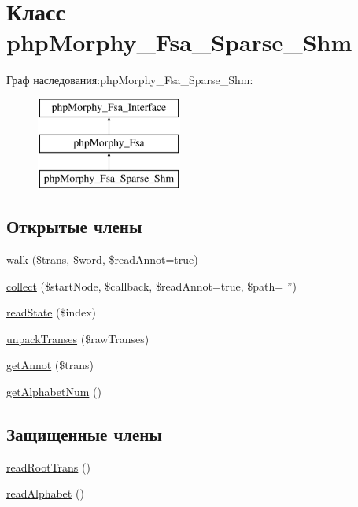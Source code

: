 \hypertarget{classphpMorphy__Fsa__Sparse__Shm}{
\section{Класс phpMorphy\_\-Fsa\_\-Sparse\_\-Shm}
\label{classphpMorphy__Fsa__Sparse__Shm}
}
Граф наследования:phpMorphy\_\-Fsa\_\-Sparse\_\-Shm:\begin{figure}[H]
\begin{center}
\leavevmode
\includegraphics[height=3.000000cm]{classphpMorphy__Fsa__Sparse__Shm}
\end{center}
\end{figure}
\subsection*{Открытые члены}
\begin{DoxyCompactItemize}
\item 
\hyperlink{classphpMorphy__Fsa__Sparse__Shm_a2203c12e49953e0b6b6b888f74e06736}{walk} (\$trans, \$word, \$readAnnot=true)
\item 
\hyperlink{classphpMorphy__Fsa__Sparse__Shm_ad62039189b9e7d4bf37535ccaad8e811}{collect} (\$startNode, \$callback, \$readAnnot=true, \$path= '')
\item 
\hyperlink{classphpMorphy__Fsa__Sparse__Shm_acb74a36605ac899a86241eddb70943bb}{readState} (\$index)
\item 
\hyperlink{classphpMorphy__Fsa__Sparse__Shm_a2f60bef354ea381f2da66a6d7d08bb3a}{unpackTranses} (\$rawTranses)
\item 
\hyperlink{classphpMorphy__Fsa__Sparse__Shm_a3fab1babdd6491ca1aa7082565b6e890}{getAnnot} (\$trans)
\item 
\hyperlink{classphpMorphy__Fsa__Sparse__Shm_a9bc843727d80cdc2e7a09ed967b2ee9a}{getAlphabetNum} ()
\end{DoxyCompactItemize}
\subsection*{Защищенные члены}
\begin{DoxyCompactItemize}
\item 
\hyperlink{classphpMorphy__Fsa__Sparse__Shm_a7a2c397ab0e8cdf62b883ed2b0e4cfe7}{readRootTrans} ()
\item 
\hyperlink{classphpMorphy__Fsa__Sparse__Shm_a3cd9ae256fe490c85fbe3345c29bbbe1}{readAlphabet} ()
\end{DoxyCompactItemize}
